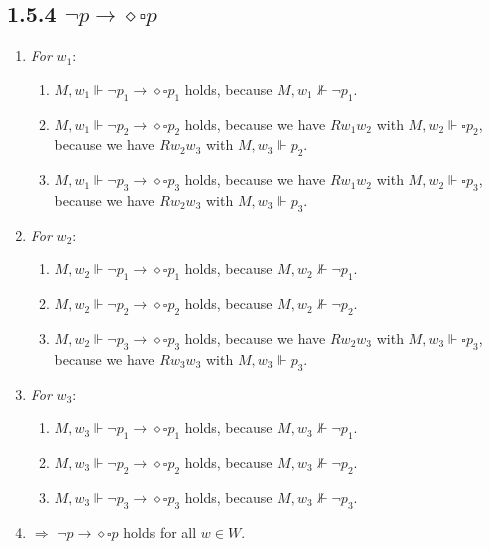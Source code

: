\documentclass{report}
\begin{document}
		\subsection*{1.5.4 $\neg p \rightarrow \diamond \square p$}
		\begin{enumerate}[]
			\item \textit{For} $w_1$:
			\begin{enumerate}[]
				\item $M, w_1 \Vdash \neg p_1 \rightarrow \diamond \square p_1$ holds, because $M, w_1 \not \Vdash \neg p_1$.
				\item $M, w_1 \Vdash \neg p_2 \rightarrow \diamond \square p_2$ holds, because we have $Rw_1w_2$ with $M,w_2 \Vdash \square p_2$, because we have $Rw_2w_3$ with $M,w_3 \Vdash p_2$.
				\item $M, w_1 \Vdash \neg p_3 \rightarrow \diamond \square p_3$ holds, because we have $Rw_1w_2$ with $M,w_2 \Vdash \square p_3$, because we have $Rw_2w_3$ with $M,w_3 \Vdash p_3$.
			\end{enumerate}
			\item \textit{For} $w_2$:
			\begin{enumerate}[]
				\item $M, w_2 \Vdash \neg p_1 \rightarrow \diamond \square p_1$ holds, because $M, w_2 \not \Vdash \neg p_1$.
				\item $M, w_2 \Vdash \neg p_2 \rightarrow \diamond \square p_2$ holds, because $M, w_2 \not \Vdash \neg p_2$.
				\item $M, w_2 \Vdash \neg p_3 \rightarrow \diamond \square p_3$ holds, because we have $Rw_2w_3$ with $M,w_3 \Vdash \square p_3$, because we have $Rw_3w_3$ with $M,w_3 \Vdash p_3$.
			\end{enumerate}
			\item \textit{For} $w_3$:
			\begin{enumerate}[]
				\item $M, w_3 \Vdash \neg p_1 \rightarrow \diamond \square p_1$ holds, because $M, w_3 \not \Vdash \neg p_1$.
				\item $M, w_3 \Vdash \neg p_2 \rightarrow \diamond \square p_2$ holds, because $M, w_3 \not \Vdash \neg p_2$.
				\item $M, w_3 \Vdash \neg p_3 \rightarrow \diamond \square p_3$ holds, because $M, w_3 \not \Vdash \neg p_3$.
			\end{enumerate}
			\item $\Rightarrow$ $\neg p \rightarrow \diamond \square p$ holds for all $w \in W$. 
		\end{enumerate}
\end{document}
